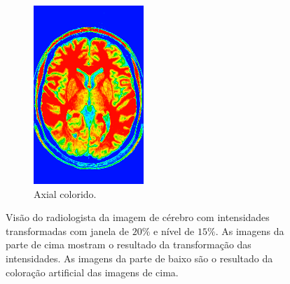 \documentclass{article}
\begin{document}
\begin{figure}[h]
\begin{subfigure}[b]{0.3\textwidth}
        \includegraphics[width=\textwidth]{brain/radiologist-axial.png}
        \caption{Axial colorido.}
    \end{subfigure}
    \caption{Visão do radiologista da imagem de cérebro com intensidades transformadas com janela de $20\%$ e nível de $15\%$. As imagens da parte de cima mostram o resultado da transformação das intensidades. As imagens da parte de baixo são o resultado da coloração artificial das imagens de cima.}
    \label{fig:brain-visao-radiologista-cores}
\end{figure}
\end{document}
